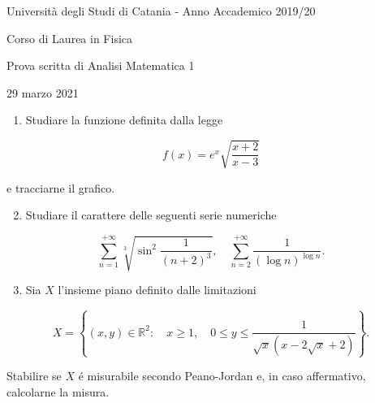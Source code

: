 \documentclass[10pt]{article}
\begin{document}
Università degli Studi di Catania - Anno Accademico 2019/20

Corso di Laurea in Fisica

Prova scritta di Analisi Matematica 1

29 marzo 2021

\begin{enumerate}
  \item Studiare la funzione definita dalla legge
\end{enumerate}

\[
f(x)=e^{x} \sqrt{\frac{x+2}{x-3}}
\]

e tracciarne il grafico.

\begin{enumerate}
  \setcounter{enumi}{1}
  \item Studiare il carattere delle seguenti serie numeriche
\end{enumerate}

\[
\sum_{n=1}^{+\infty} \sqrt[3]{\sin ^{2} \frac{1}{(n+2)^{3}}}, \quad \sum_{n=2}^{+\infty} \frac{1}{(\log n)^{\log n}} .
\]

\begin{enumerate}
  \setcounter{enumi}{2}
  \item Sia \(X\) l'insieme piano definito dalle limitazioni
\end{enumerate}

\[
X=\left\{(x, y) \in \mathbb{R}^{2}: \quad x \geq 1, \quad 0 \leq y \leq \frac{1}{\sqrt{x}(x-2 \sqrt{x}+2)}\right\} .
\]

Stabilire se \(X\) é misurabile secondo Peano-Jordan e, in caso affermativo, calcolarne la misura.
\end{document}
